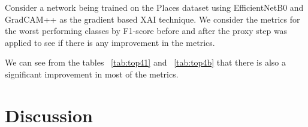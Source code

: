 \documentclass[a4paper,11pt,openright]{book}
\begin{document}
Consider a network being trained on the Places \cite{zhouPlaces10Million2018} dataset using EfficientNetB0 \cite{tanEfficientnetRethinkingModel2019} and GradCAM++ \cite{chattopadhayGradCAMGeneralizedGradientBased2018} as the gradient based XAI technique. We consider the metrics for the worst performing classes by F1-score before and after the proxy step was applied to see if there is any improvement in the metrics. 

We can see from the tables ~\ref{tab:top41} and ~\ref{tab:top4b} that there is also a significant improvement in most of the metrics. 

\begin{table}[!htb]
\centering
{}
\caption{Metrics Before the Proxy Attention Step}
\label{tab:top41}
\end{table}

\begin{table}[!htb]
\centering
{}
\caption{Metrics After the Proxy Attention Step}
\label{tab:top4b}
\end{table}

\chapter{Discussion} \label{ch:discussion}
\end{document}
